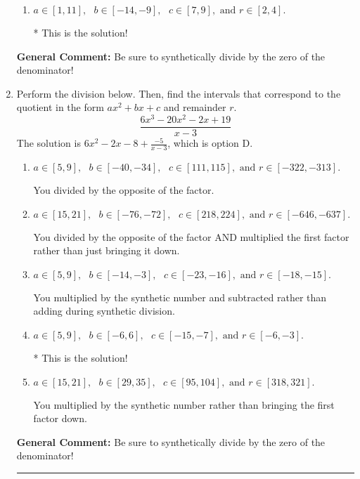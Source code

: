 \documentclass{extbook}[14pt]
\newcommand{\litem}[1]{\item #1

\rule{\textwidth}{0.4pt}}
\begin{document}
\begin{enumerate}
{\begin{enumerate}[label=\Alph*.]
 You divided by the opposite of the factor.
\item \( a \in [1, 11], \text{   } b \in [-14, -9], \text{   } c \in [7, 9], \text{   and   } r \in [2, 4]. \)

* This is the solution!
\end{enumerate}

\textbf{General Comment:} Be sure to synthetically divide by the zero of the denominator!
}
\litem{
Perform the division below. Then, find the intervals that correspond to the quotient in the form $ax^2+bx+c$ and remainder $r$.
\[ \frac{6x^{3} -20 x^{2} -2 x + 19}{x -3} \]The solution is \( 6x^{2} -2 x -8 + \frac{-5}{x -3} \), which is option D.\begin{enumerate}[label=\Alph*.]
\item \( a \in [5, 9], \text{   } b \in [-40, -34], \text{   } c \in [111, 115], \text{   and   } r \in [-322, -313]. \)

 You divided by the opposite of the factor.
\item \( a \in [15, 21], \text{   } b \in [-76, -72], \text{   } c \in [218, 224], \text{   and   } r \in [-646, -637]. \)

 You divided by the opposite of the factor AND multiplied the first factor rather than just bringing it down.
\item \( a \in [5, 9], \text{   } b \in [-14, -3], \text{   } c \in [-23, -16], \text{   and   } r \in [-18, -15]. \)

 You multiplied by the synthetic number and subtracted rather than adding during synthetic division.
\item \( a \in [5, 9], \text{   } b \in [-6, 6], \text{   } c \in [-15, -7], \text{   and   } r \in [-6, -3]. \)

* This is the solution!
\item \( a \in [15, 21], \text{   } b \in [29, 35], \text{   } c \in [95, 104], \text{   and   } r \in [318, 321]. \)

 You multiplied by the synthetic number rather than bringing the first factor down.
\end{enumerate}

\textbf{General Comment:} Be sure to synthetically divide by the zero of the denominator!
}
\end{enumerate}
\end{document}
